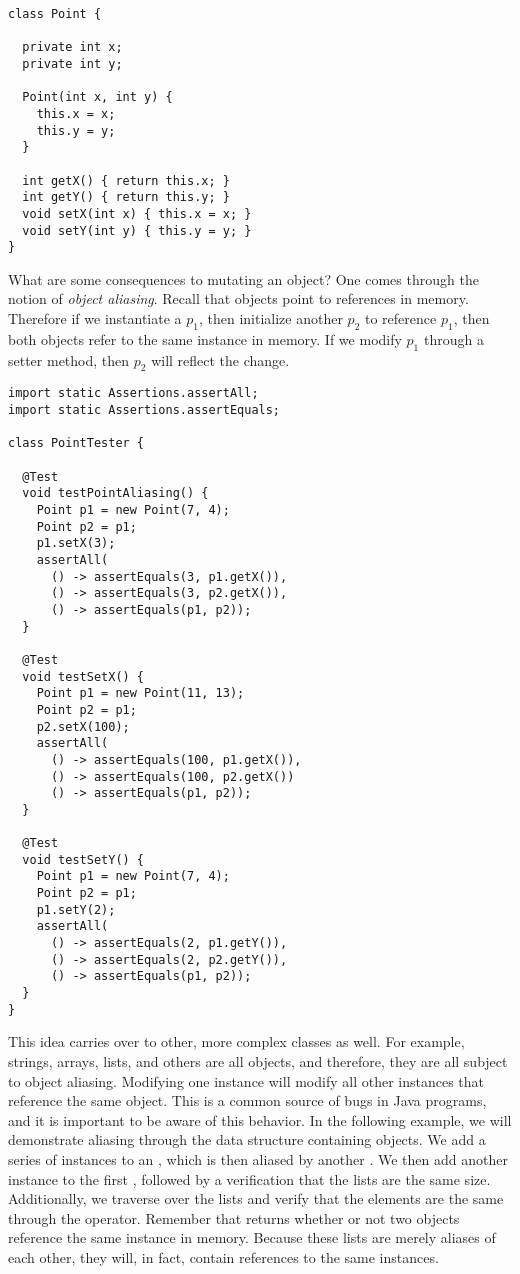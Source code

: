 \begin{lstlisting}[language=MyJava]
class Point {

  private int x;
  private int y;

  Point(int x, int y) { 
    this.x = x; 
    this.y = y; 
  }

  int getX() { return this.x; }
  int getY() { return this.y; }
  void setX(int x) { this.x = x; }
  void setY(int y) { this.y = y; }
}
\end{lstlisting}

What are some consequences to mutating an object? One comes through the notion of \emph{object aliasing}. Recall that objects point to references in memory. Therefore if we instantiate a  $p_1$, then initialize another  $p_2$ to reference $p_1$, then both objects refer to the same  instance in memory. If we modify $p_1$ through a setter method, then $p_2$ will reflect the change.

\begin{lstlisting}[language=MyJava]
import static Assertions.assertAll;
import static Assertions.assertEquals;

class PointTester {

  @Test
  void testPointAliasing() {
    Point p1 = new Point(7, 4);
    Point p2 = p1;
    p1.setX(3);
    assertAll(
      () -> assertEquals(3, p1.getX()),
      () -> assertEquals(3, p2.getX()),
      () -> assertEquals(p1, p2));
  }

  @Test
  void testSetX() {
    Point p1 = new Point(11, 13);
    Point p2 = p1;
    p2.setX(100);
    assertAll(
      () -> assertEquals(100, p1.getX()),
      () -> assertEquals(100, p2.getX())
      () -> assertEquals(p1, p2));
  }

  @Test
  void testSetY() {
    Point p1 = new Point(7, 4);
    Point p2 = p1;
    p1.setY(2);
    assertAll(
      () -> assertEquals(2, p1.getY()),
      () -> assertEquals(2, p2.getY()),
      () -> assertEquals(p1, p2));
  }
}
\end{lstlisting}

This idea carries over to other, more complex classes as well. For example, strings, arrays, lists, and others are all objects, and therefore, they are all subject to object aliasing. Modifying one  instance will modify all other  instances that reference the same object. This is a common source of bugs in Java programs, and it is important to be aware of this behavior. In the following example, we will demonstrate aliasing through the  data structure containing  objects. We add a series of  instances to an , which is then aliased by another . We then add another  instance to the first , followed by a verification that the lists are the same size. Additionally, we traverse over the lists and verify that the elements are the same through the \ttt{==} operator. Remember that \ttt{==} returns whether or not two objects reference the same instance in memory. Because these lists are merely aliases of each other, they will, in fact, contain references to the same  instances.


